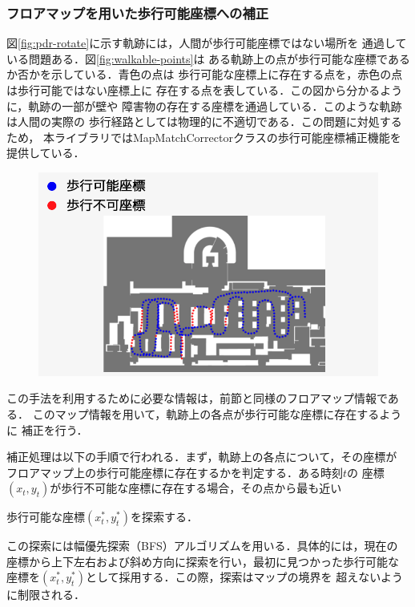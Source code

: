 
\subsubsection{フロアマップを用いた歩行可能座標への補正}

図\ref{fig:pdr-rotate}に示す軌跡には，人間が歩行可能座標ではない場所を
通過している問題ある．図\ref{fig:walkable-points}は
ある軌跡上の点が歩行可能な座標であるか否かを示している．青色の点は
歩行可能な座標上に存在する点を，赤色の点は歩行可能ではない座標上に
存在する点を表している．この図から分かるように，軌跡の一部が壁や
障害物の存在する座標を通過している．このような軌跡は人間の実際の
歩行経路としては物理的に不適切である．この問題に対処するため，
本ライブラリではMapMatchCorrectorクラスの歩行可能座標補正機能を提供している．

\begin{figure}[H]
    \centering
    \includegraphics[width=\linewidth]{../image/unwalkable_points.jpg}
    \caption{}    \label{fig:unwalkable_points}
\end{figure}

この手法を利用するために必要な情報は，前節と同様のフロアマップ情報である．
このマップ情報を用いて，軌跡上の各点が歩行可能な座標に存在するように
補正を行う．

補正処理は以下の手順で行われる．まず，軌跡上の各点について，その座標が
フロアマップ上の歩行可能座標に存在するかを判定する．ある時刻$t$の
座標$(x_t, y_t)$が歩行不可能な座標に存在する場合，その点から最も近い

歩行可能な座標$(x_t^*, y_t^*)$を探索する．

この探索には幅優先探索（BFS）アルゴリズムを用いる．具体的には，現在の
座標から上下左右および斜め方向に探索を行い，最初に見つかった歩行可能な
座標を$(x_t^*, y_t^*)$として採用する．この際，探索はマップの境界を
超えないように制限される．

